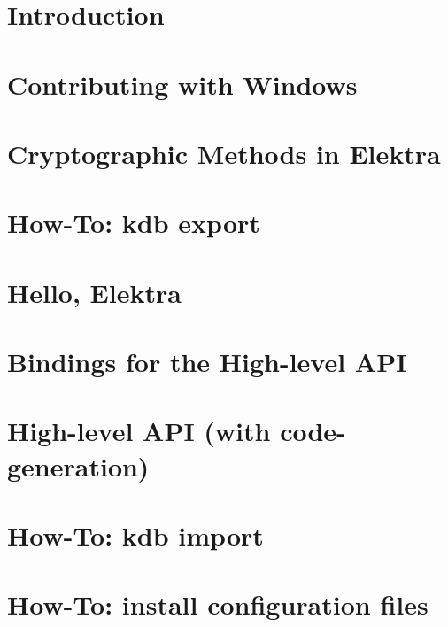 \let\mypdfximage\pdfximage\def\pdfximage{\immediate\mypdfximage}\documentclass[twoside]{book}
\newcommand{\+}{\discretionary{\mbox{\scriptsize$\hookleftarrow$}}{}{}}
\begin{document}
\chapter{Introduction}
\label{doc_tutorials_contributing-clion_md}

\chapter{Contributing with Windows}
\label{doc_tutorials_contributing-windows_md}

\chapter{Cryptographic Methods in Elektra}
\label{doc_tutorials_crypto_md}

\chapter{How-\/\+To\+: kdb export}
\label{doc_tutorials_export_md}

\chapter{Hello, Elektra}
\label{doc_tutorials_hello-elektra_md}

\chapter{Bindings for the High-\/level API}
\label{doc_tutorials_highlevel-bindings_md}

\chapter{High-\/level API (with code-\/generation)}
\label{doc_tutorials_highlevel_md}

\chapter{How-\/\+To\+: kdb import}
\label{doc_tutorials_import_md}

\chapter{How-\/\+To\+: install configuration files}
\label{doc_tutorials_install-config-files_md}

\end{document}
